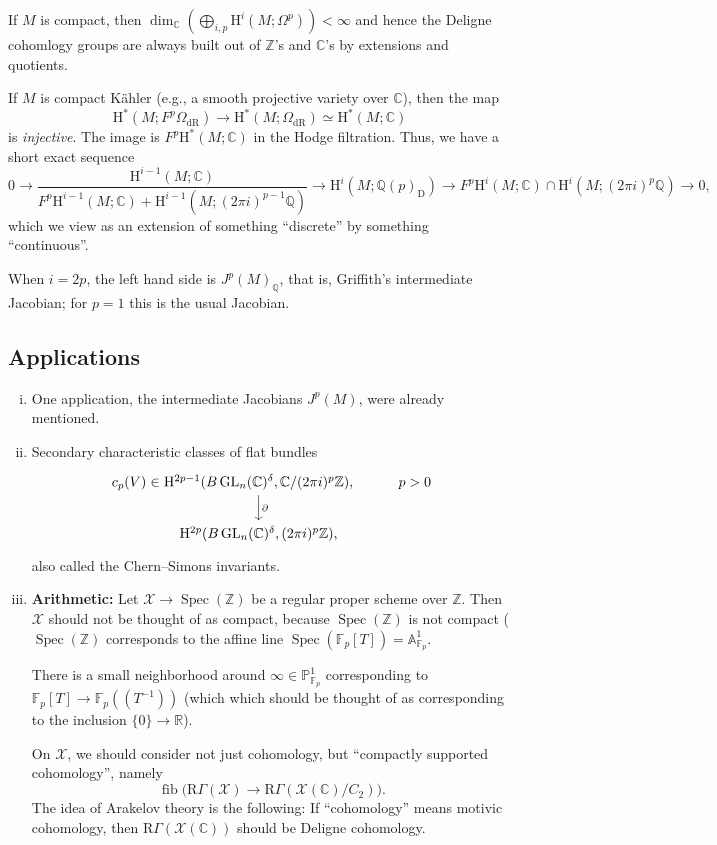 \documentclass[draft]{amsart}
\newcommand{\ZZ}{\mathbb{Z}}
\newcommand{\QQ}{\mathbb{Q}}
\newcommand{\RR}{\mathbb{R}}
\newcommand{\CC}{\mathbb{C}}
\newcommand{\FF}{\mathbb{F}}
\renewcommand{\AA}{\mathbb{A}}
\newcommand{\PP}{\mathbb{P}}
\renewcommand{\H}{\mathrm{H}}
\newcommand{\D}{\mathrm{D}}
\newcommand{\R}{\mathrm{R}}
\newcommand{\cat}[1]{\mathcal{#1}}
\DeclareMathOperator{\Spec}{Spec}
\DeclareMathOperator{\fib}{fib}
\DeclareMathOperator{\GL}{GL}
\theoremstyle{definition}
\begin{document}
If $M$ is compact, then $\dim_{\CC} (\bigoplus_{i,p} \H^i(M; \Omega^p)) < \infty$ and hence the Deligne cohomlogy groups are always built out of $\ZZ$'s and $\CC$'s by extensions and quotients.

If $M$ is compact K\"ahler (e.g., a smooth projective variety over $\CC$), then the map
\[
\H^*(M; F^p\Omega_{\mathrm{dR}}) \to \H^*(M; \Omega_{\mathrm{dR}}) \simeq \H^*(M;\CC)
\]
is \emph{injective}. The image is $F^p\H^*(M;\CC)$ in the Hodge filtration. Thus, we have a short exact sequence
\[
0\to \frac{\H^{i-1}(M;\CC)}{F^p\H^{i-1}(M;\CC) + \H^{i-1}(M; (2\pi i)^{p-1}\QQ)} \to 
\H^i(M; \QQ(p)_{\D}) \to F^p\H^i(M;\CC) \cap \H^i(M; (2\pi i)^p\QQ) \to 0,
\]
which we view as an extension of something \enquote{discrete} by something \enquote{continuous}.

When $i = 2p$, the left hand side is $J^p(M)_{\QQ}$, that is, Griffith's intermediate Jacobian; for $p=1$ this is the usual Jacobian.

\subsection{Applications} 
\begin{enumerate}[(i)]
\item One application, the intermediate Jacobians $J^p(M)$, were already mentioned.

\item Secondary characteristic classes of flat bundles
\[
\begin{tikzcd}
c_p(V) \ar[r,phantom,"\in"] &[-2em]  \H^{2p-1}(B\GL_n(\CC)^{\delta}, \CC/(2\pi i)^p\ZZ), \ar[d,"\partial"] & p>0 \\
& \H^{2p}(B\GL_n(\CC)^{\delta}, (2\pi i)^p\ZZ),
\end{tikzcd}
\]
also called the Chern--Simons invariants.

\item \textbf{Arithmetic:} Let $\cat{X} \to \Spec(\ZZ)$ be a regular proper scheme over $\ZZ$. Then $\cat X$ should not be thought of as compact, because $\Spec(\ZZ)$ is not compact ($\Spec(\ZZ)$ corresponds to the affine line $\Spec(\FF_p[T]) = \AA^1_{\FF_p}$. 

There is a small neighborhood around $\infty \in \PP^1_{\FF_p}$ corresponding to $\FF_p[T] \to \FF_p((T^{-1}))$ (which which should be thought of as corresponding to the inclusion $\{0\} \to \RR$).

On $\cat X$, we should consider not just cohomology, but \enquote{compactly supported cohomology}, namely
\[
\fib\bigl(\R\Gamma(\cat X) \to \R\Gamma(\cat X(\CC)/C_2)\bigr).
\]
The idea of Arakelov theory is the following: If \enquote{cohomology} means motivic cohomology, then $\R\Gamma(\cat X(\CC))$ should be Deligne cohomology.
\end{enumerate}
\end{document}
